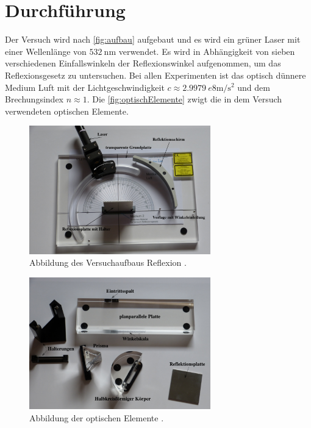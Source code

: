 \section{Durchführung}
\label{sec:Durchführung}

Der Versuch wird nach \autoref{fig:aufbau} aufgebaut und es wird ein grüner Laser mit einer Wellenlänge von $\SI{532}{\nano\meter}$ verwendet. 
Es wird in Abhängigkeit von sieben verschiedenen Einfallswinkeln der Reflexionswinkel aufgenommen, um das Reflexionsgesetz zu untersuchen.
Bei allen Experimenten ist das optisch dünnere Medium Luft mit der Lichtgeschwindigkeit $c\approx \SI{2,9979}{e8\meter\per\second\squared}$ und dem Brechungsindex $n\approx 1$.
Die \autoref{fig:optischElemente} zwigt die in dem Versuch verwendeten optischen Elemente.

\begin{figure}[H]
    \centering
    \includegraphics[width=0.7\textwidth]{data/aufbau1.png}
    \caption{Abbildung des Versuchaufbaus Reflexion \cite{Anleitung400}.}
    \label{fig:aufbau}
\end{figure}

\begin{figure}[H]
    \centering
    \includegraphics[width=0.7\textwidth]{data/optischeElemente.png}
    \caption{Abbildung der optischen Elemente \cite{Anleitung400}.}
    \label{fig:optischElemente}
\end{figure}

